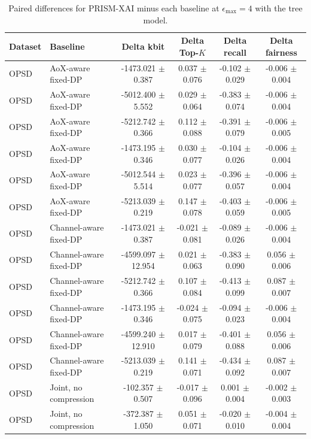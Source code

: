 \begin{table}[t]
\caption{Paired differences for PRISM-XAI minus each baseline at $\epsilon_{\max}=4$ with the tree model.}
\label{tab:paired-differences}
\centering
\scriptsize
\setlength{\tabcolsep}{3pt}
\begin{tabular}{llcccc}
\toprule
Dataset & Baseline & Delta kbit & Delta Top-$K$ & Delta recall & Delta fairness \\
\midrule
OPSD & AoX-aware fixed-DP & -1473.021 $\pm$ 0.387 & 0.037 $\pm$ 0.076 & -0.102 $\pm$ 0.029 & -0.006 $\pm$ 0.004 \\
OPSD & AoX-aware fixed-DP & -5012.400 $\pm$ 5.552 & 0.029 $\pm$ 0.064 & -0.383 $\pm$ 0.074 & -0.006 $\pm$ 0.004 \\
OPSD & AoX-aware fixed-DP & -5212.742 $\pm$ 0.366 & 0.112 $\pm$ 0.088 & -0.391 $\pm$ 0.079 & -0.006 $\pm$ 0.005 \\
OPSD & AoX-aware fixed-DP & -1473.195 $\pm$ 0.346 & 0.030 $\pm$ 0.077 & -0.104 $\pm$ 0.026 & -0.006 $\pm$ 0.004 \\
OPSD & AoX-aware fixed-DP & -5012.544 $\pm$ 5.514 & 0.023 $\pm$ 0.077 & -0.396 $\pm$ 0.057 & -0.006 $\pm$ 0.004 \\
OPSD & AoX-aware fixed-DP & -5213.039 $\pm$ 0.219 & 0.147 $\pm$ 0.078 & -0.403 $\pm$ 0.059 & -0.006 $\pm$ 0.005 \\
OPSD & Channel-aware fixed-DP & -1473.021 $\pm$ 0.387 & -0.021 $\pm$ 0.081 & -0.089 $\pm$ 0.026 & -0.006 $\pm$ 0.004 \\
OPSD & Channel-aware fixed-DP & -4599.097 $\pm$ 12.954 & 0.021 $\pm$ 0.063 & -0.383 $\pm$ 0.090 & 0.056 $\pm$ 0.006 \\
OPSD & Channel-aware fixed-DP & -5212.742 $\pm$ 0.366 & 0.107 $\pm$ 0.084 & -0.413 $\pm$ 0.099 & 0.087 $\pm$ 0.007 \\
OPSD & Channel-aware fixed-DP & -1473.195 $\pm$ 0.346 & -0.024 $\pm$ 0.075 & -0.094 $\pm$ 0.023 & -0.006 $\pm$ 0.004 \\
OPSD & Channel-aware fixed-DP & -4599.240 $\pm$ 12.910 & 0.017 $\pm$ 0.079 & -0.401 $\pm$ 0.088 & 0.056 $\pm$ 0.006 \\
OPSD & Channel-aware fixed-DP & -5213.039 $\pm$ 0.219 & 0.141 $\pm$ 0.071 & -0.434 $\pm$ 0.092 & 0.087 $\pm$ 0.007 \\
OPSD & Joint, no compression & -102.357 $\pm$ 0.507 & -0.017 $\pm$ 0.096 & 0.001 $\pm$ 0.004 & -0.002 $\pm$ 0.003 \\
OPSD & Joint, no compression & -372.387 $\pm$ 1.050 & 0.051 $\pm$ 0.071 & -0.020 $\pm$ 0.010 & -0.004 $\pm$ 0.004 \\

\end{tabular}
\end{table}
